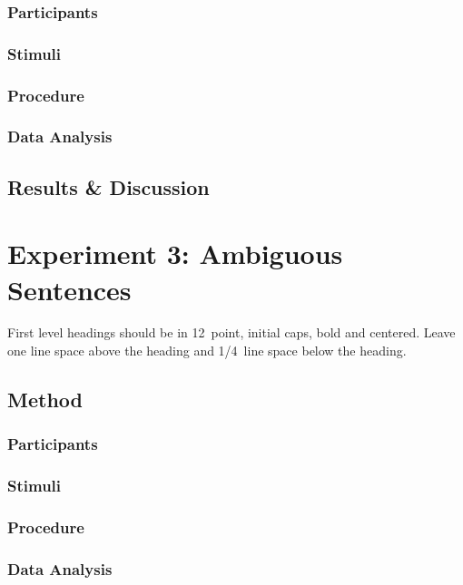 \documentclass[10pt,letterpaper]{article}
\begin{document}
\subsubsection{Participants}

\subsubsection{Stimuli}

\subsubsection{Procedure}

\subsubsection{Data Analysis}

\subsection{Results \& Discussion}

\section{Experiment 3: Ambiguous Sentences}

First level headings should be in 12~point, initial caps, bold and
centered. Leave one line space above the heading and 1/4~line space
below the heading.

\subsection{Method}

\subsubsection{Participants}

\subsubsection{Stimuli}

\subsubsection{Procedure}

\subsubsection{Data Analysis}
\end{document}
